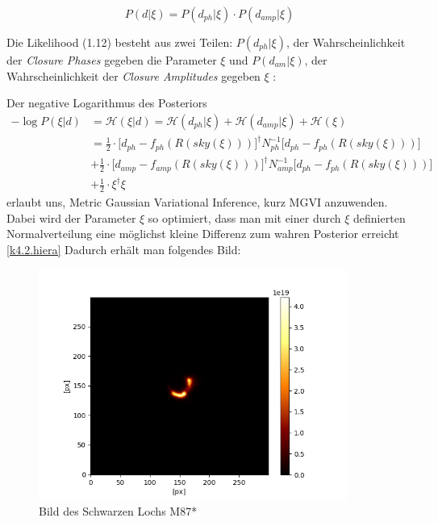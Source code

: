 \begin{equation}
P(d|\xi)=  {P(d_{ph}|\xi)\cdot P(d_{amp}|\xi)}    
\end{equation}

Die Likelihood (1.12) besteht aus zwei Teilen: $P(d_{ph}|\xi)$, der Wahrscheinlichkeit der \emph{Closure Phases} gegeben die Parameter $\xi$ und $P(d_{am}| \xi)$, der Wahrscheinlichkeit der \emph{Closure Amplitudes} gegeben $\xi$ : 

Der negative Logarithmus des Posteriors
\begin{align} \label{k4.2.Posterior}
 -\log {P(\xi|d)} &= 
 \mathcal{H} (\xi|d) = \mathcal{H} (d_{ph}|\xi)+\mathcal{H} (d_{amp}|\xi)+\mathcal{H} (\xi) \\
&= \frac {1}{2}\cdot \Bigg[d_{ph} - f_{ph}(R(sky(\xi))) \Bigg]^\dagger N^{-1}_{ph} \Bigg[d_{ph} - f_{ph}(R(sky(\xi))) \Bigg] 
\\  & + \frac {1}{2}\cdot \Bigg[d_{amp} - f_{amp}(R(sky(\xi))) \Bigg]^\dagger N_{amp}^{-1}\Bigg[d_{ph} - f_{ph}(R(sky(\xi))) \Bigg] \nonumber
\\ & +  \frac {1}{2} \cdot \xi^\dagger \xi \nonumber  
\end{align} 
 erlaubt uns, Metric Gaussian Variational Inference, kurz MGVI \parencite{k4.2.mgvi} anzuwenden. Dabei wird der Parameter $\xi$ so optimiert, dass man mit einer durch $\xi$ definierten Normalverteilung eine möglichst kleine Differenz zum wahren Posterior erreicht \cref{k4.2.hiera}
Dadurch erhält man folgendes Bild:

\begin{figure}[htb]
    \centering
    \includegraphics[width = 0.9\textwidth]{k4.2/black-hole-lin.png}
    \caption{Bild des Schwarzen Lochs M87*}
    \label{k4.2.black-hole-lin}
\end{figure}

